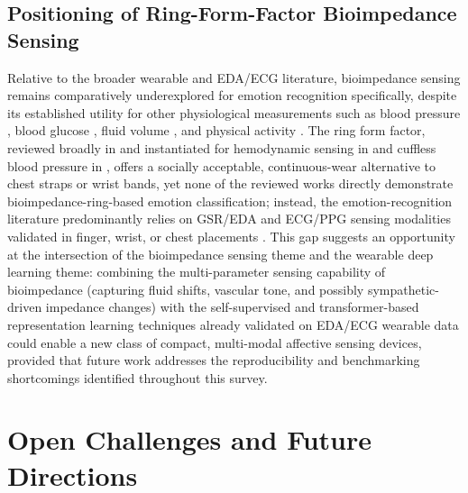 \subsection{Positioning of Ring-Form-Factor Bioimpedance Sensing}
Relative to the broader wearable and EDA/ECG literature, bioimpedance sensing remains comparatively underexplored for emotion recognition specifically, despite its established utility for other physiological measurements such as blood pressure \cite{sel2023continuous,lindstrom2025wearable}, blood glucose \cite{sanai2021evaluation}, fluid volume \cite{noori2025sensitivity}, and physical activity \cite{jacobs2026advancing}. The ring form factor, reviewed broadly in \cite{wang2025computing} and instantiated for hemodynamic sensing in \cite{lindstrom2025wearable} and cuffless blood pressure in \cite{sel2023continuous}, offers a socially acceptable, continuous-wear alternative to chest straps or wrist bands, yet none of the reviewed works directly demonstrate bioimpedance-ring-based emotion classification; instead, the emotion-recognition literature predominantly relies on GSR/EDA and ECG/PPG sensing modalities validated in finger, wrist, or chest placements \cite{sanchezcomas2021correlation,zangroniz2017electrodermal,bamonte2024determining}. This gap suggests an opportunity at the intersection of the bioimpedance sensing theme and the wearable deep learning theme: combining the multi-parameter sensing capability of bioimpedance (capturing fluid shifts, vascular tone, and possibly sympathetic-driven impedance changes) with the self-supervised and transformer-based representation learning techniques already validated on EDA/ECG wearable data \cite{dissanayake2022sigrep,wu2023transformer,li2025transformer} could enable a new class of compact, multi-modal affective sensing devices, provided that future work addresses the reproducibility and benchmarking shortcomings identified throughout this survey.

\section{Open Challenges and Future Directions}\label{sec:challenges}
